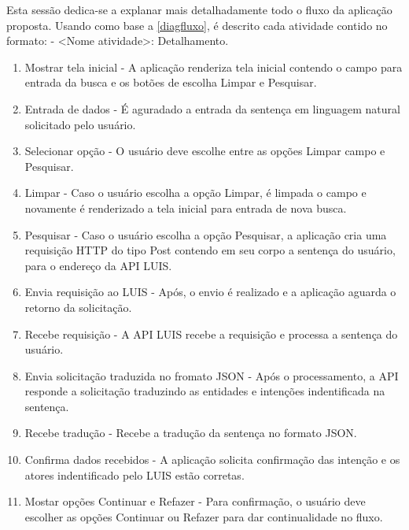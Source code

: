Esta sessão dedica-se a explanar mais detalhadamente todo o fluxo da aplicação proposta. Usando como base a \autoref{diagfluxo}, é descrito cada atividade contido no formato: - <Nome atividade>: Detalhamento.

\clearpage
\begin{enumerate}
	\item Mostrar tela inicial - A aplicação renderiza tela inicial contendo o campo para entrada da busca e os botões de escolha Limpar e Pesquisar.
	\item Entrada de dados - É aguradado a entrada da sentença em linguagem natural solicitado pelo usuário.
	\item Selecionar opção - O usuário deve escolhe entre as opções Limpar campo e Pesquisar.
	\item Limpar - Caso o usuário escolha a opção Limpar, é limpada o campo e novamente é renderizado a tela inicial para entrada de nova busca.
	\item Pesquisar - Caso o usuário escolha a opção Pesquisar, a aplicação cria uma requisição HTTP do tipo Post contendo em seu corpo a sentença do usuário, para o endereço da API LUIS.
	\item Envia requisição ao LUIS - Após, o envio é realizado e a aplicação aguarda o retorno da solicitação.
	\item Recebe requisição - A API LUIS recebe a requisição e processa a sentença do usuário.
	\item Envia solicitação traduzida no fromato JSON - Após o processamento, a API responde a solicitação traduzindo as entidades e intenções indentificada na sentença.
	\item Recebe tradução - Recebe a tradução da sentença no formato JSON.
	\item Confirma dados recebidos - A aplicação solicita confirmação das intenção e os atores indentificado pelo LUIS estão corretas.
	\item Mostar opções Continuar e Refazer - Para confirmação, o usuário deve escolher as opções Continuar ou Refazer para dar continualidade no fluxo.
\end{enumerate}
